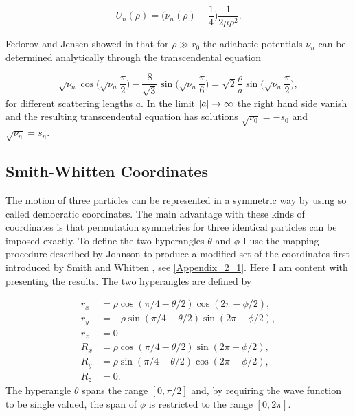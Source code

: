 \begin{equation}\label{eq:faddeev_effectivepot}
U_{n}(\rho) = \Big(\nu_n(\rho)-\frac{1}{4}\Big)\frac{1}{2 \mu \rho^2}.
\end{equation}

Fedorov and Jensen showed in \cite{Fedorov1993} that for $\rho \gg r_0$ the adiabatic potentials $\nu_n$ can be determined analytically through the transcendental equation

\begin{equation}\label{eq:transcendental}
\sqrt{\nu_n} \cos{\bigg(\sqrt{\nu_n} \frac{\pi}{2}\bigg)} - \frac{8}{\sqrt{3}}\sin{\bigg(\sqrt{\nu_n} \frac{\pi}{6}\bigg)} = \sqrt{2}\frac{\rho}{a}\sin{\bigg(\sqrt{\nu_n} \frac{\pi}{2}\bigg)}, 
\end{equation}
for different scattering lengths $a$. In the limit $\lvert a\rvert \rightarrow \infty$ the right hand side vanish and the resulting transcendental equation has solutions $\sqrt{\nu_0}=-s_0$ and $\sqrt{\nu_n}=s_n$.
\subsection{Smith-Whitten Coordinates}\label{smith_whitten}
The motion of three particles can be represented in a symmetric way by using so called democratic coordinates. The main advantage with these kinds of coordinates is that permutation symmetries for three identical particles can be imposed exactly. To define the two hyperangles $\theta$ and $\phi$ I use the mapping procedure described by Johnson \cite{Johnson1980} to produce a modified set of the coordinates first introduced by Smith and Whitten \cite{Smith_Whitten1968}, see \cref{Appendix_2_1}. Here I am content with presenting the results. The two hyperangles are defined by

\begin{equation}
\begin{aligned}
r_x &= \rho \cos(\pi/4-\theta/2)\cos(2\pi - \phi/2),\\
r_y &= -\rho \sin(\pi/4-\theta/2)\sin(2\pi - \phi/2),\\
r_z &= 0\\
R_x &= \rho \cos(\pi/4-\theta/2)\sin(2\pi - \phi/2),\\
R_y &= \rho \sin(\pi/4-\theta/2)\cos(2\pi - \phi/2),\\
R_z &= 0.
\end{aligned}   
\end{equation}
The hyperangle $\theta$ spans the range $[0,\pi/2]$ and, by requiring the wave function to be single valued, the span of $\phi$ is restricted to the range $[0,2\pi]$. 

